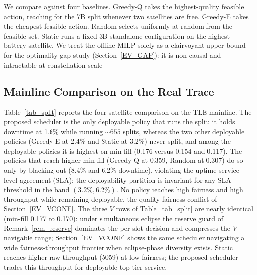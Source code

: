 We compare against four baselines. Greedy-Q takes the highest-quality feasible
action, reaching for the 7B split whenever two satellites are free. Greedy-E
takes the cheapest feasible action. Random selects uniformly at random from
the feasible set. Static runs a fixed 3B standalone configuration on the
highest-battery satellite. We treat the offline MILP solely as a clairvoyant
upper bound for the optimality-gap study (Section~\ref{EV_GAP}): it is
non-causal and intractable at constellation scale.

\subsection{Mainline Comparison on the Real Trace}\label{EV_MULTI}
Table~\ref{tab_split} reports the four-satellite comparison on the TLE
mainline. The proposed scheduler is the only deployable policy that runs the
split: it holds downtime at 1.6\% while running ${\sim}655$ splits, whereas
the two other deployable policies (Greedy-E at 2.4\% and Static at 3.2\%)
never split, and among the deployable policies it is highest on min-fill
(0.176 versus 0.154 and 0.117). The policies that reach higher min-fill
(Greedy-Q at 0.359, Random at 0.307) do so only by blacking out (8.4\% and
6.2\% downtime), violating the uptime service-level agreement (SLA); the
deployability partition is invariant for any SLA threshold in the band
$(3.2\%, 6.2\%)$. No policy reaches high fairness and high throughput while
remaining deployable, the quality-fairness conflict of
Section~\ref{EV_VCONF}. The three $V$ rows of Table~\ref{tab_split} are
nearly identical (min-fill 0.177 to 0.170): under simultaneous eclipse the
reserve guard of Remark~\ref{rem_reserve} dominates the per-slot decision and
compresses the $V$-navigable range; Section~\ref{EV_VCONF} shows the same
scheduler navigating a wide fairness-throughput frontier when eclipse-phase
diversity exists. Static reaches higher raw throughput (5059) at low fairness;
the proposed scheduler trades this throughput for deployable top-tier service.

